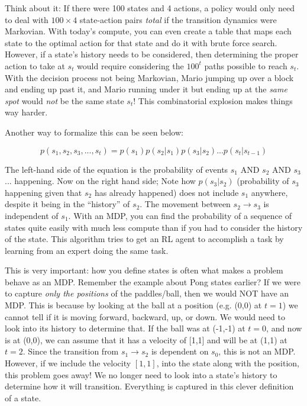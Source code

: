     Think about it: If there were 100 states and 4 actions, a policy would only need to deal with $100 \times 4$ state-action pairs \textit{total} if the transition dynamics were Markovian. With today's compute, you can even create a table that maps each state to the optimal action for that state and do it with brute force search. However, if a state's history needs to be considered, then determining the proper action to take at $s_t$ would require considering the $100^t$ paths possible to reach $s_t$. With the decision process not being Markovian, Mario jumping up over a block and ending up past it, and Mario running under it but ending up at the \textit{same spot} would \textit{not} be the same state $s_t$! This combinatorial explosion makes things way harder. 

    Another way to formalize this can be seen below:

    $$p(s_1, s_2, s_3,...,s_t) = p(s_1)p(s_2|s_1)p(s_3|s_2)...p(s_t|s_{t-1})$$

    The left-hand side of the equation is the probability of events $s_1$ AND $s_2$ AND $s_3$... happening. Now on the right hand side; Note how $p(s_3|s_2)$ (probability of $s_3$ happening given that $s_2$ has already happened) does not include $s_1$ anywhere, despite it being in the ``history'' of $s_2$. The movement between $s_2 \rightarrow s_3$ is independent of $s_1$. With an MDP, you can find the probability of a sequence of states quite easily with much less compute than if you had to consider the history of the state. This algorithm tries to get an RL agent to accomplish a task by learning from an expert doing the same task.  

    This is very important: how you define states is often what makes a problem behave as an MDP. Remember the example about Pong states earlier? If we were to capture \textit{only the positions} of the paddles/ball, then we would NOT have an MDP. This is because by looking at the ball at a position (e.g. (0,0) at $t=1$) we cannot tell if it is moving forward, backward, up, or down. We would need to look into its history to determine that. If the ball was at (-1,-1) at $t=0$, and now is at (0,0), we can assume that it has a velocity of [1,1] and will be at (1,1) at $t=2$. Since the transition from $s_1 \rightarrow s_2$ is dependent on $s_0$, this is not an MDP. However, if we include the velocity $[1,1]$, into the state along with the position, this problem goes away! We no longer need to look into a state's history to determine how it will transition. Everything is captured in this clever definition of a state.


